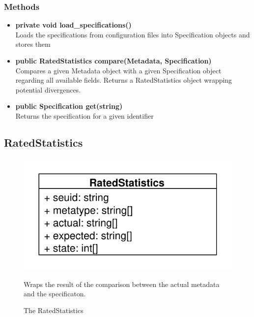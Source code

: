 \subsubsection{Methods}
\begin{itemize}
	\item \textbf{private void load\_specifications()}\\
	Loads the specifications from configuration files into Specification objects and stores them
	\item \textbf{public RatedStatistics compare(Metadata, Specification)}\\
	Compares a given Metadata object with a given Specification object regarding all available fields. Returns a RatedStatistics object wrapping potential divergences.
	\item \textbf{public Specification get(string)}\\
	Returns the specification for a given identifier
\end{itemize}


\subsection{RatedStatistics}
\begin{figure}[htbp]
	\begin{minipage}[t]{7cm}
		\vspace{0pt}
		\centering
		\includegraphics[scale=0.6]{./diagram_pictures/RatedStatistics.pdf}
		\caption{The RatedStatistics}
	\end{minipage}
	\hfill
	\begin{minipage}[t]{8cm}
		\vspace{10pt}
		Wraps the result of the comparison between the actual metadata and the specificaton.
	\end{minipage}
\end{figure}

